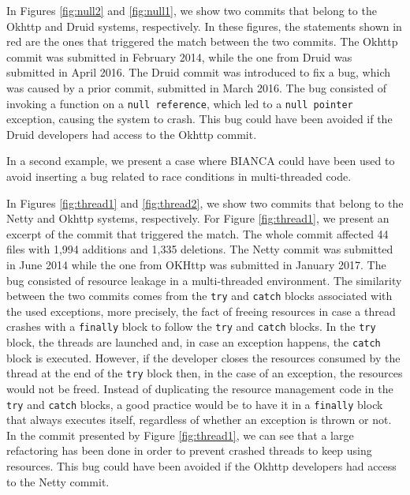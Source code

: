 \documentclass[12pt]{report}
\begin{document}


In Figures \ref{fig:null2} and \ref{fig:null1}, we show two commits that
belong to the Okhttp and Druid systems, respectively. In these figures,
the statements shown in red are the ones that triggered the match
between the two commits. The Okhttp commit was submitted in February
2014, while the one from Druid was submitted in April 2016. The Druid
commit was introduced to fix a bug, which was caused by a prior commit,
submitted in March 2016. The bug consisted of invoking a function on a
\lstinline!null reference!, which led to a \lstinline!null pointer!
exception, causing the system to crash. This bug could have been avoided
if the Druid developers had access to the Okhttp commit.

In a second example, we present a case where BIANCA could have been used
to avoid inserting a bug related to race conditions in multi-threaded
code.



In Figures \ref{fig:thread1} and \ref{fig:thread2}, we show two commits
that belong to the Netty and Okhttp systems, respectively. For Figure
\ref{fig:thread1}, we present an excerpt of the commit that triggered
the match. The whole commit affected 44 files with 1,994 additions and
1,335 deletions. The Netty commit was submitted in June 2014 while the
one from OKHttp was submitted in January 2017. The bug consisted of
resource leakage in a multi-threaded environment. The similarity between
the two commits comes from the \texttt{try} and \texttt{catch} blocks
associated with the used exceptions, more precisely, the fact of freeing
resources in case a thread crashes with a \texttt{finally} block to
follow the \texttt{try} and \texttt{catch} blocks. In the \texttt{try}
block, the threads are launched and, in case an exception happens, the
\texttt{catch} block is executed. However, if the developer closes the
resources consumed by the thread at the end of the \texttt{try} block
then, in the case of an exception, the resources would not be freed.
Instead of duplicating the resource management code in the \texttt{try}
and \texttt{catch} blocks, a good practice would be to have it in a
\texttt{finally} block that always executes itself, regardless of
whether an exception is thrown or not. In the commit presented by Figure
\ref{fig:thread1}, we can see that a large refactoring has been done in
order to prevent crashed threads to keep using resources. This bug could
have been avoided if the Okhttp developers had access to the Netty
commit.
\end{document}
